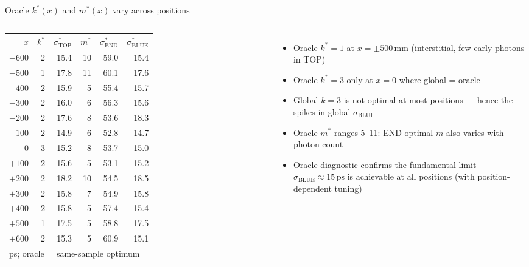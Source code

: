 \documentclass[aspectratio=169,9pt]{beamer}
\newcommand{\sEnd}{\sigma_{\mathrm{END}}}
\newcommand{\sTop}{\sigma_{\mathrm{TOP}}}
\newcommand{\sBlu}{\sigma_{\mathrm{BLUE}}}
\newcommand{\ps}{\ensuremath{\,\mathrm{ps}}}
\newcommand{\mm}{\ensuremath{\,\mathrm{mm}}}
\begin{document}
\begin{frame}{Oracle $k^*(x)$ and $m^*(x)$ vary across positions}
\begin{columns}[c]
\footnotesize
\begin{tabular}{rrrrrr}
\toprule
$x$ & $k^*$ & $\sTop^*$ & $m^*$ & $\sEnd^*$ & $\sBlu^*$ \\
\midrule
$-600$ & 2 & 15.4 & 10 & 59.0 & 15.4 \\
$-500$ & 1 & 17.8 & 11 & 60.1 & 17.6 \\
$-400$ & 2 & 15.9 & \phantom{1}5 & 55.4 & 15.7 \\
$-300$ & 2 & 16.0 & \phantom{1}6 & 56.3 & 15.6 \\
$-200$ & 2 & 17.6 & \phantom{1}8 & 53.6 & 18.3 \\
$-100$ & 2 & 14.9 & \phantom{1}6 & 52.8 & 14.7 \\
$\phantom{+}0$ & 3 & 15.2 & \phantom{1}8 & 53.7 & 15.0 \\
$+100$ & 2 & 15.6 & \phantom{1}5 & 53.1 & 15.2 \\
$+200$ & 2 & 18.2 & 10 & 54.5 & 18.5 \\
$+300$ & 2 & 15.8 & \phantom{1}7 & 54.9 & 15.8 \\
$+400$ & 2 & 15.8 & \phantom{1}5 & 57.4 & 15.4 \\
$+500$ & 1 & 17.5 & \phantom{1}5 & 58.8 & 17.5 \\
$+600$ & 2 & 15.3 & \phantom{1}5 & 60.9 & 15.1 \\
\bottomrule
\multicolumn{6}{l}{\scriptsize ps; oracle = same-sample optimum}
\end{tabular}
\begin{itemize}\setlength\itemsep{4pt}
  \item Oracle $k^*=1$ at $x=\pm500\mm$
    (interstitial, few early photons in TOP)
  \item Oracle $k^*=3$ only at $x=0$ where
    global = oracle
  \item Global $k=3$ is not optimal at most
    positions — hence the spikes in global $\sBlu$
  \item Oracle $m^*$ ranges 5–11: END optimal $m$
    also varies with photon count
  \item Oracle diagnostic confirms the fundamental
    limit $\sBlu \approx 15\ps$ is achievable
    at all positions (with position-dependent tuning)
\end{itemize}
\end{columns}
\end{frame}
\end{document}
